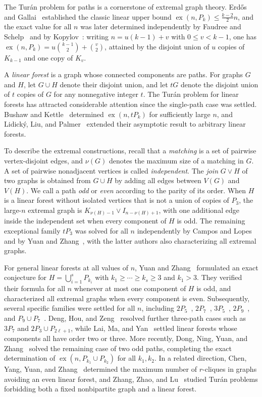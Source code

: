 \documentclass[10pt]{article}
\theoremstyle{compactplain}
\theoremstyle{remark}\newtheorem{remark}[theorem]{Remark}
\newcommand{\ex}{\operatorname{ex}}
\begin{document}
The Tur\'an problem for paths is a cornerstone of extremal graph theory.
Erd\H{o}s and Gallai~\cite{EG} established the classic linear upper bound
$\ex(n,P_k)\le\frac{k-2}{2}n$, and the exact value for all $n$ was later
determined independently by Faudree and Schelp~\cite{FS} and by
Kopylov~\cite{Kopylov}: writing $n=u(k-1)+v$ with $0\le v<k-1$, one has
$\ex(n,P_k)=u\binom{k-1}{2}+\binom{v}{2}$, attained by the disjoint
union of $u$ copies of $K_{k-1}$ and one copy of $K_v$.

A \emph{linear forest} is a graph whose connected components are paths.
For graphs $G$ and $H$, let $G\cup H$ denote their disjoint union, and
let $tG$ denote the disjoint union of $t$ copies of $G$ for any
nonnegative integer $t$. The Tur\'an problem for linear forests has
attracted considerable attention since the single-path case was settled.
Bushaw and Kettle~\cite{BushawKettle} determined $\ex(n,tP_k)$ for
sufficiently large $n$, and Lidick\'y, Liu, and Palmer~\cite{LLP}
extended their asymptotic result to arbitrary linear forests.

To describe the extremal constructions, recall that a \emph{matching} is
a set of pairwise vertex-disjoint edges, and $\nu(G)$ denotes the maximum
size of a matching in $G$. A set of pairwise nonadjacent vertices is
called \emph{independent}. The \emph{join} $G\vee H$ of two graphs is
obtained from $G\cup H$ by adding all edges between $V(G)$ and $V(H)$. We
call a path \emph{odd} or \emph{even} according to the parity of its
order. When $H$ is a linear forest without isolated vertices that is not
a union of copies of $P_3$, the large-$n$ extremal graph is
$K_{\nu(H)-1}\vee I_{n-\nu(H)+1}$, with one additional edge inside the
independent set when every component of $H$ is odd. The remaining
exceptional family $tP_3$ was solved for all $n$ independently by Campos
and Lopes~\cite{CL} and by Yuan and Zhang~\cite{YZtriples}, with the
latter authors also characterizing all extremal graphs.

For general linear forests at all values of $n$, Yuan and
Zhang~\cite{YZ} formulated an exact conjecture for
$H=\bigcup_{i=1}^s P_{k_i}$ with $k_1\ge\cdots\ge k_s\ge3$ and $k_1>3$.
They verified their formula for all $n$ whenever at most one component of
$H$ is odd, and characterized all extremal graphs when every component is
even. Subsequently, several specific families were settled for all $n$,
including $2P_5$~\cite{BielakKieliszek}, $2P_7$~\cite{LanQinShi},
$3P_5$~\cite{FengHu}, $2P_9$~\cite{ZhangWang}, and
$P_9\cup P_7$~\cite{FangYou}. Deng, Hou, and Zeng~\cite{DHZ} resolved
further three-path cases such as $3P_7$ and $2P_3\cup P_{2\ell+1}$, while
Lai, Ma, and Yan~\cite{LMY} settled linear forests whose components all
have order two or three. More recently, Dong, Ning, Yuan, and
Zhang~\cite{DNYZ} solved the remaining case of two odd paths, completing
the exact determination of $\ex(n,P_{k_1}\cup P_{k_2})$ for all
$k_1,k_2$. In a related direction, Chen, Yang, Yuan, and
Zhang~\cite{CYYZ} determined the maximum number of $r$-cliques in graphs
avoiding an even linear forest, and Zhang, Zhao, and Lu~\cite{ZZL}
studied Tur\'an problems forbidding both a fixed nonbipartite graph and a
linear forest.
\end{document}
